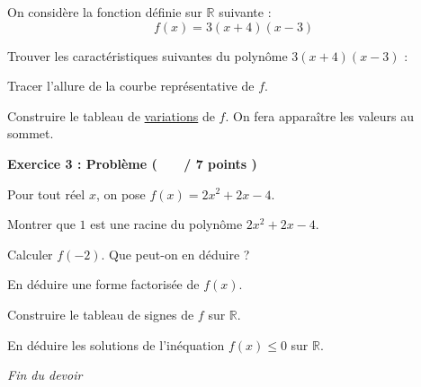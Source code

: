 \documentclass[12pt,a4paper]{exam}
\begin{document}
\vspace{5pt}
\noindent
On considère la fonction définie sur $\mathbb{R}$ suivante :
\[
f(x) = 3(x+4)(x-3)
\]

\begin{questions}

\question Trouver les caractéristiques suivantes du polynôme 
$3(x+4)(x-3)$ :

\question[1] Tracer l'allure de la courbe représentative de $f$.


\question[2] Construire le tableau de \underline{variations} de $f$. On fera 
apparaître les valeurs au sommet.

\end{questions}

\vspace{0.5cm}

\noindent
\textbf{Exercice 3 : Problème ( \ \ \ / 7 points )}

\vspace{5pt}
\noindent
Pour tout réel $x$, on pose $f(x) = 2x^2 + 2x - 4$.

\begin{questions}

\question[1] Montrer que $1$ est une racine du 
polynôme $2x^2 + 2x - 4$.

\question[1] Calculer $f(-2)$. Que peut-on en déduire ?

\question[2] En déduire une forme factorisée de $f(x)$.

\question[2] Construire le tableau de signes de $f$ sur $\mathbb{R}$.

\question[1] En déduire les solutions de l'inéquation $f(x) \leq 0$ sur $\mathbb{R}$.

\end{questions}

\vspace{0.5cm}

\begin{center}
    \textit{Fin du devoir}
\end{center}
\end{document}
